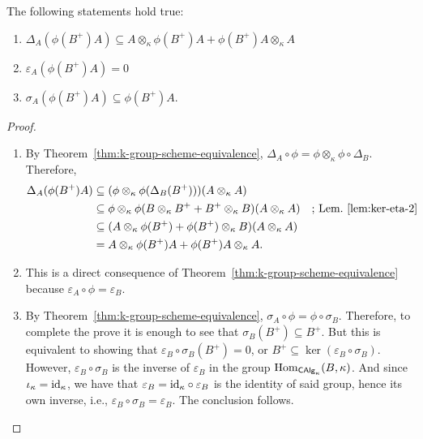 \begin{lem}\label{lem:ker-eta-3}
    The following statements hold true:
    \begin{enumerate}[\rm a)]
        \item $\Delta_A(\phi(B^+)A)
            \subseteq A\otimes_\kappa\phi(B^+)A + \phi(B^+)A\otimes_\kappa A$
        \item $\varepsilon_A(\phi(B^+)A)=0$
        \item $\sigma_A(\phi(B^+)A)\subseteq\phi(B^+)A$.
    \end{enumerate}
\end{lem}

\begin{proof}${}$
    \begin{enumerate}[\rm a)]
        \item By Theorem~\ref{thm:k-group-scheme-equivalence}, $\Delta_A\circ\phi=\phi\otimes_\kappa\phi\circ\Delta_B$. Therefore, 
        \begin{align*}
            \Delta_A(\phi(B^+)A)&\subseteq
                (\phi\otimes_\kappa\phi(\Delta_B(B^+)))(A\otimes_\kappa A)\\
                &\subseteq\phi\otimes_\kappa\phi
                    (B \otimes_\kappa B^++B^+\otimes_\kappa B)
                    (A\otimes_\kappa A)
                    &&\text{; Lem.~\ref{lem:ker-eta-2}}\\
                &\subseteq
                    (A\otimes_\kappa\phi(B^+)+\phi(B^+)\otimes_\kappa B)
                    (A\otimes_\kappa A)\\
                &= A\otimes_\kappa\phi(B^+)A + \phi(B^+)A\otimes_\kappa A.
        \end{align*}

        \item This is a direct consequence of Theorem~\ref{thm:k-group-scheme-equivalence} because $\varepsilon_A\circ\phi=\varepsilon_B$.

        \item By Theorem~\ref{thm:k-group-scheme-equivalence}, $\sigma_A\circ\phi=\phi\circ\sigma_B$. Therefore, to complete the prove it is enough to see that $\sigma_B(B^+)\subseteq B^+$. But this is equivalent to showing that $\varepsilon_B\circ\sigma_B(B^+)=0$, or $B^+\subseteq\ker(\varepsilon_B\circ\sigma_B)$. However, $\varepsilon_B\circ\sigma_B$ is the inverse of $\varepsilon_B$ in the group ${\rm Hom}_{\mathsf{CAlg}_\kappa}(B,\kappa)$. And since $\iota_\kappa=\text{\rm id}_\kappa$, we have that $\varepsilon_B=\text{\rm id}_\kappa\circ\varepsilon_B$ is the identity of said group, hence its own inverse, i.e., $\varepsilon_B\circ\sigma_B=\varepsilon_B$. The conclusion follows.
    \end{enumerate}
\end{proof}

